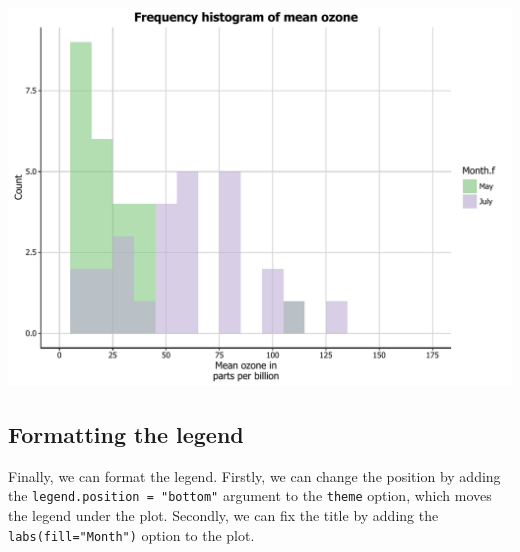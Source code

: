 \documentclass[]{article}
\begin{document}
\begin{center}\includegraphics{0_all_posts_pdf/histogram_19-1} \end{center}

\subsection{Formatting the legend}\label{formatting-the-legend}

Finally, we can format the legend. Firstly, we can change the position
by adding the \texttt{legend.position\ =\ "bottom"} argument to the
\texttt{theme} option, which moves the legend under the plot. Secondly,
we can fix the title by adding the \texttt{labs(fill="Month")} option to
the plot.
\end{document}
